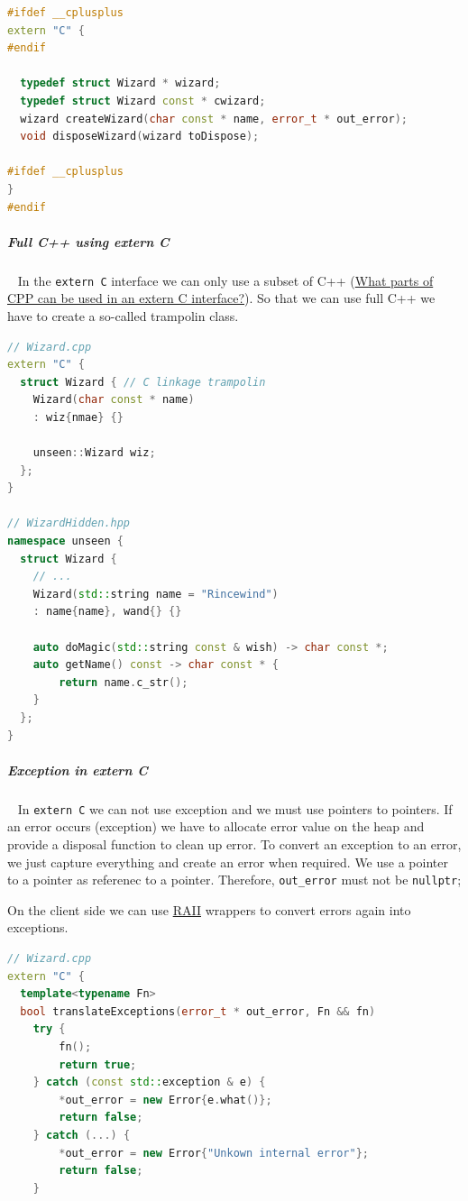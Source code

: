 \documentclass[11pt,twoside,landscape]{article}
\begin{document}
\begin{multicols}{2}
\begin{lstlisting}[language=c++,label=lst:example-for-a-extern-c-interface,caption={Example for a extern C interface},captionpos=b,numbers=none]
#ifdef __cplusplus
extern "C" {
#endif

  typedef struct Wizard * wizard;
  typedef struct Wizard const * cwizard;
  wizard createWizard(char const * name, error_t * out_error);
  void disposeWizard(wizard toDispose);

#ifdef __cplusplus
}
#endif
\end{lstlisting}

\subparagraph{Full C++ using extern C} \
\label{sec:orgccae2ac}
In the \texttt{extern C} interface we can only use a subset of C++ (\href{../../../roam/20230706185259-what_parts_of_cpp_can_be_used_in_an_extern_c_interface.org}{What parts of CPP can be used in an extern C interface?}).
So that we can use full C++ we have to create a so-called trampolin class.

\begin{lstlisting}[language=c++,label=lst:example-for-a-trampolin-class,caption={Example for a trampolin class},captionpos=b,numbers=none]
// Wizard.cpp
extern "C" {
  struct Wizard { // C linkage trampolin
    Wizard(char const * name)
    : wiz{nmae} {}

    unseen::Wizard wiz;
  };
}

// WizardHidden.hpp
namespace unseen {
  struct Wizard {
    // ...
    Wizard(std::string name = "Rincewind")
    : name{name}, wand{} {}

    auto doMagic(std::string const & wish) -> char const *;
    auto getName() const -> char const * {
        return name.c_str();
    }
  };
}
\end{lstlisting}

\subparagraph{Exception in extern C} \
\label{sec:org74dbaec}
In \texttt{extern C} we can not use exception and we must use pointers to pointers.
If an error occurs (exception) we have to allocate error value on the heap and provide a disposal function to clean up error.
To convert an exception to an error, we just capture everything and create an error when required.
We use a pointer to a pointer as referenec to a pointer.
Therefore, \texttt{out\_error} must not be \texttt{nullptr};

On the client side we can use \href{../../../roam/20220118172628-resource_acquisition_is_initialization.org}{RAII} wrappers to convert errors again into exceptions.


\begin{lstlisting}[language=c++,numbers=none]
// Wizard.cpp
extern "C" {
  template<typename Fn>
  bool translateExceptions(error_t * out_error, Fn && fn)
    try {
        fn();
        return true;
    } catch (const std::exception & e) {
        *out_error = new Error{e.what()};
        return false;
    } catch (...) {
        *out_error = new Error{"Unkown internal error"};
        return false;
    }


\end{lstlisting}
\end{multicols}
\end{document}
